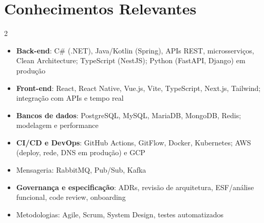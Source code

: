 \documentclass[letterpaper,11pt]{article}
\begin{document}
\section{Conhecimentos Relevantes}
    \begin{multicols}{2}
        \begin{itemize}[itemsep=-5pt, parsep=3pt]
            \item\small \textbf{Back-end}: C\# (.NET), Java/Kotlin (Spring), APIs REST, microsserviços, Clean Architecture; TypeScript (NestJS); Python (FastAPI, Django) em produção
            \item\small \textbf{Front-end}: React, React Native, Vue.js, Vite, TypeScript, Next.js, Tailwind; integração com APIs e tempo real
            \item\small \textbf{Bancos de dados}: PostgreSQL, MySQL, MariaDB, MongoDB, Redis; modelagem e performance
            \item\small \textbf{CI/CD e DevOps}: GitHub Actions, GitFlow, Docker, Kubernetes; AWS (deploy, rede, DNS em produção) e GCP
            \item\small Mensageria: RabbitMQ, Pub/Sub, Kafka
            \item\small \textbf{Governança e especificação}: ADRs, revisão de arquitetura, ESF/análise funcional, code review, onboarding
            \item\small Metodologias: Agile, Scrum, System Design, testes automatizados
        \end{itemize}
    \end{multicols}
    \vspace*{2.0\multicolsep}

\end{document}

